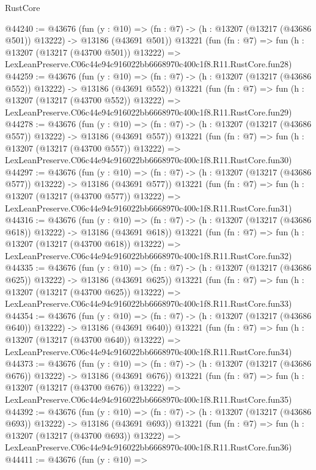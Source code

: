 \begin{lexlean}{RustCore}
\begin{coremodule}
@44240 := @43676
    (fun (y : @10) =>
    (fn : @7) -> (h : @13207 (@13217 (@43686 @501)) @13222) -> @13186 (@43691 @501))
    @13221
    (fun (fn : @7) =>
    fun (h : @13207 (@13217 (@43700 @501)) @13222) =>
    LexLeanPreserve.C06c44e94c916022bb6668970c400c1f8.R11.RustCore.fun28)
@44259 := @43676
    (fun (y : @10) =>
    (fn : @7) -> (h : @13207 (@13217 (@43686 @552)) @13222) -> @13186 (@43691 @552))
    @13221
    (fun (fn : @7) =>
    fun (h : @13207 (@13217 (@43700 @552)) @13222) =>
    LexLeanPreserve.C06c44e94c916022bb6668970c400c1f8.R11.RustCore.fun29)
@44278 := @43676
    (fun (y : @10) =>
    (fn : @7) -> (h : @13207 (@13217 (@43686 @557)) @13222) -> @13186 (@43691 @557))
    @13221
    (fun (fn : @7) =>
    fun (h : @13207 (@13217 (@43700 @557)) @13222) =>
    LexLeanPreserve.C06c44e94c916022bb6668970c400c1f8.R11.RustCore.fun30)
@44297 := @43676
    (fun (y : @10) =>
    (fn : @7) -> (h : @13207 (@13217 (@43686 @577)) @13222) -> @13186 (@43691 @577))
    @13221
    (fun (fn : @7) =>
    fun (h : @13207 (@13217 (@43700 @577)) @13222) =>
    LexLeanPreserve.C06c44e94c916022bb6668970c400c1f8.R11.RustCore.fun31)
@44316 := @43676
    (fun (y : @10) =>
    (fn : @7) -> (h : @13207 (@13217 (@43686 @618)) @13222) -> @13186 (@43691 @618))
    @13221
    (fun (fn : @7) =>
    fun (h : @13207 (@13217 (@43700 @618)) @13222) =>
    LexLeanPreserve.C06c44e94c916022bb6668970c400c1f8.R11.RustCore.fun32)
@44335 := @43676
    (fun (y : @10) =>
    (fn : @7) -> (h : @13207 (@13217 (@43686 @625)) @13222) -> @13186 (@43691 @625))
    @13221
    (fun (fn : @7) =>
    fun (h : @13207 (@13217 (@43700 @625)) @13222) =>
    LexLeanPreserve.C06c44e94c916022bb6668970c400c1f8.R11.RustCore.fun33)
@44354 := @43676
    (fun (y : @10) =>
    (fn : @7) -> (h : @13207 (@13217 (@43686 @640)) @13222) -> @13186 (@43691 @640))
    @13221
    (fun (fn : @7) =>
    fun (h : @13207 (@13217 (@43700 @640)) @13222) =>
    LexLeanPreserve.C06c44e94c916022bb6668970c400c1f8.R11.RustCore.fun34)
@44373 := @43676
    (fun (y : @10) =>
    (fn : @7) -> (h : @13207 (@13217 (@43686 @676)) @13222) -> @13186 (@43691 @676))
    @13221
    (fun (fn : @7) =>
    fun (h : @13207 (@13217 (@43700 @676)) @13222) =>
    LexLeanPreserve.C06c44e94c916022bb6668970c400c1f8.R11.RustCore.fun35)
@44392 := @43676
    (fun (y : @10) =>
    (fn : @7) -> (h : @13207 (@13217 (@43686 @693)) @13222) -> @13186 (@43691 @693))
    @13221
    (fun (fn : @7) =>
    fun (h : @13207 (@13217 (@43700 @693)) @13222) =>
    LexLeanPreserve.C06c44e94c916022bb6668970c400c1f8.R11.RustCore.fun36)
@44411 := @43676
    (fun (y : @10) =>

\end{coremodule}
\end{lexlean}
